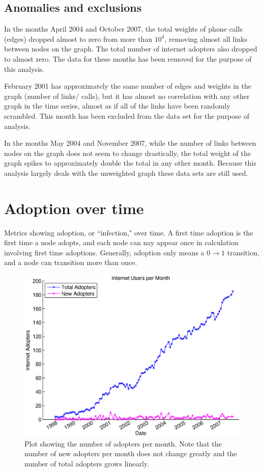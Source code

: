 \documentclass[12pt]{article}
\begin{document}
\subsection{Anomalies and exclusions}
In the months April 2004 and October 2007, the total weights of phone calls (edges) dropped almost to zero from more than \(10^4\), removing almost all links between nodes on the graph. The total number of internet adopters also dropped to almost zero. The data for these months has been removed for the purpose of this analysis.

February 2001 has approximately the same number of edges and weights in the graph (number of links/ calls), but it has almost no correlation with any other graph in the time series, almost as if all of the links have been randomly scrambled. This month has been excluded from the data set for the purpose of analysis.

In the months May 2004 and November 2007, while the number of links between nodes on the graph does not seem to change drastically, the total weight of the graph spikes to approximately double the total in any other month. Because this analysis largely deals with the unweighted graph these data sets are still used.

\section{Adoption over time}

Metrics showing adoption, or ``infection," over time. A first time adoption is the first time a node adopts, and each node can nay appear once in calculation involving first time adoptions. Generally, adoption only means a \(0 \rightarrow 1\) transition, and a node can transition more than once.

\begin{figure}[H]
\includegraphics[width = .7\textwidth]{Graficos/AdoptersperMonth.eps}
\caption{Plot showing the number of adopters per month. Note that the number of new adopters per month does not change greatly and the number of total adopters grows linearly.}
\label{fig:AdoptersperMonth}
\end{figure}
\end{document}
